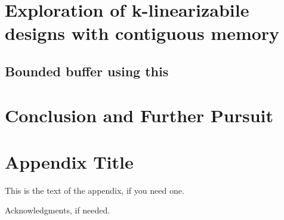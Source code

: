 \documentclass{sigplanconf}
\begin{document}
\section{Exploration of k-linearizabile designs with contiguous memory}
\subsection{Bounded buffer using this}

\section{Conclusion and Further Pursuit}

\appendix
\section{Appendix Title}

This is the text of the appendix, if you need one.

\acks

Acknowledgments, if needed.





%
%
%
\end{document}
